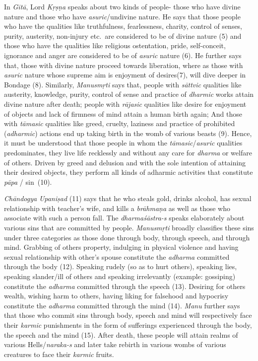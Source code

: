 In \emph{Gītā}, Lord \emph{Kṛṣṇa} speaks about two kinds of people- those who have divine nature and those who have \emph{asuric}/undivine nature. He says that those people who have the qualities like truthfulness, fearlessness, charity, control of senses, purity, austerity, non-injury etc.\ are considered to be of divine nature (5) and those who have the qualities like religious ostentation, pride, self-conceit, ignorance and anger are considered to be of \emph{asuric} nature (6). He further says that, those with divine nature proceed towards liberation, where as those with \emph{asuric} nature whose supreme aim is enjoyment of desires(7), will dive deeper in Bondage (8). Similarly, \emph{Manusmṛti} says that, people with \emph{sāttvic} qualities like austerity, knowledge, purity, control of sense and practice of \emph{dharmic} works attain divine nature after death; people with \emph{rājasic} qualities like desire for enjoyment of objects and lack of firmness of mind attain a human birth again; And those with \emph{tāmasic} qualities like greed, cruelty, laziness and practice of prohibited (\emph{adharmic}) actions end up taking birth in the womb of various beasts (9). Hence, it must be understood that those people in whom the \emph{tāmasic}/\emph{asuric} qualities predominates, they live life recklessly and without any care for \emph{dharma} or welfare of others. Driven by greed and delusion and with the sole intention of attaining their desired objects, they perform all kinds of adharmic activities that constitute \emph{pāpa} / sin~(10).

\emph{Chāndogya} \emph{Upaniṣad} (11) says that he who steals gold, drinks alcohol, has sexual relationship with teacher's wife, and kills a \emph{brāhmaṇa} as well as those who associate with such a person fall. The \emph{dharmaśāstra-s} speaks elaborately about various sins that are committed by people. \emph{Manusmṛti} broadly classifies these sins under three categories as those done through body, through speech, and through mind. Grabbing of others property, indulging in physical violence and having sexual relationship with other's spouse constitute the \emph{adharma} committed through the body (12). Speaking rudely (so as to hurt others), speaking lies, speaking slander/ill of others and speaking irrelevantly (example: gossiping) constitute the \emph{adharma} committed through the speech (13). Desiring for others wealth, wishing harm to others, having liking for falsehood and hypocrisy constitute the \emph{adharma} committed through the mind (14). \emph{Manu} further says that those who commit sins through body, speech and mind will respectively face their \emph{karmic} punishments in the form of sufferings experienced through the body, the speech and the mind (15). After death, these people will attain realms of various Hells/\emph{naraka-s} and later take rebirth in various wombs of various creatures to face their \emph{karmic} fruits.

